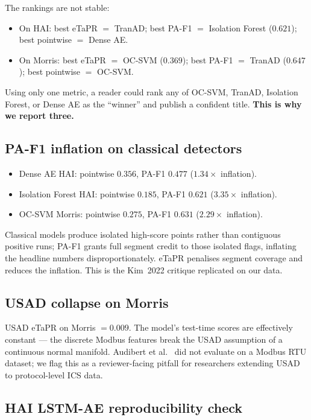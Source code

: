 The rankings are not stable:
\begin{itemize}
  \item On HAI: best eTaPR $=$ TranAD; best PA-F1 $=$ Isolation Forest ($0.621$); best pointwise $=$ Dense AE.
  \item On Morris: best eTaPR $=$ OC-SVM ($0.369$); best PA-F1 $=$ TranAD ($0.647$); best pointwise $=$ OC-SVM.
\end{itemize}

Using only one metric, a reader could rank any of OC-SVM, TranAD, Isolation Forest, or Dense AE as the ``winner'' and publish a confident title.  \textbf{This is why we report three.}

\subsection{PA-F1 inflation on classical detectors}

\begin{itemize}
  \item Dense AE HAI: pointwise $0.356$, PA-F1 $0.477$ ($1.34\times$ inflation).
  \item Isolation Forest HAI: pointwise $0.185$, PA-F1 $0.621$ ($3.35\times$ inflation).
  \item OC-SVM Morris: pointwise $0.275$, PA-F1 $0.631$ ($2.29\times$ inflation).
\end{itemize}

Classical models produce isolated high-score points rather than contiguous positive runs; PA-F1 grants full segment credit to those isolated flags, inflating the headline numbers disproportionately.  eTaPR penalises segment coverage and reduces the inflation.  This is the Kim~2022 \cite{kim2022towards} critique replicated on our data.

\subsection{USAD collapse on Morris}

USAD eTaPR on Morris $= 0.009$.  The model's test-time scores are effectively constant --- the discrete Modbus features break the USAD assumption of a continuous normal manifold.  Audibert et al.~\cite{audibert2020usad} did not evaluate on a Modbus RTU dataset; we flag this as a reviewer-facing pitfall for researchers extending USAD to protocol-level ICS data.

\subsection{HAI LSTM-AE reproducibility check}

